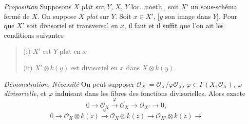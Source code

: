 \documentclass[11pt,a4paper]{article}
\begin{document}
\emph{Proposition} \quad Supposons $X$ plat sur $Y$, $X$, $Y$ loc.\ noeth.,
soit $X'$ un sous-schéma fermé de $X$. On suppose $X$ \emph{plat} sur $Y$.
Soit $x \in X'$, [$y$ son image dans $Y$]. Pour que $X'$ soit divisoriel et
transversal \struck{\ill{}}  en $x$, il faut et il suffit
que l'on ait les conditions suivantes
\begin{quote}
(i) $X'$ est $Y$-plat en $x$

(ii) $X' \otimes k(y)$ est divisoriel \struck{\ill{}} en $x$ dans
$X \otimes k(y)$.
\end{quote}

\emph{Démonstration}. \emph{Nécessité} On peut supposer
$\mathcal{O}_{X'} = \mathcal{O}_X/\varphi\mathcal{O}_X$,
$\varphi \in \Gamma(X, \mathcal{O}_X)$, $\varphi$ \struck{\ill{} \ill{}
\ill{}}  \struck{\ill{}} \emph{divisorielle}, et $\varphi$
induisant dans les fibres des fonctions divisorielles. Alors 
exacte
\[
  0 \to \mathcal{O}_X \xrightarrow{\ \varphi\ } \mathcal{O}_X \to
  \mathcal{O}_{X'} \to 0 ,
\]
 \struck{\ill{} \ill{}}
\[
  0 \to \mathcal{O}_X \otimes k(z) \xrightarrow{\ \varphi\ }
  \mathcal{O}_X \otimes k(z) \to \mathcal{O}_{X'} \otimes k(z) \to
\]
\end{document}
